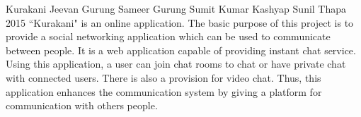  \begin{conf-abstract}[]
 {Kurakani }
{
Jeevan Gurung 
Sameer Gurung
Sumit Kumar Kashyap
Sunil Thapa
}
{ 2015 }
``Kurakani" is an online application. The basic purpose of this project is to provide a social networking application which can be used to communicate between people. It is a web application capable of providing instant chat service. Using this application, a user can join chat rooms to chat or have private chat with connected users. There is also a provision for video chat. Thus, this application enhances the communication system by giving a platform for communication with others people.
  \end{conf-abstract}